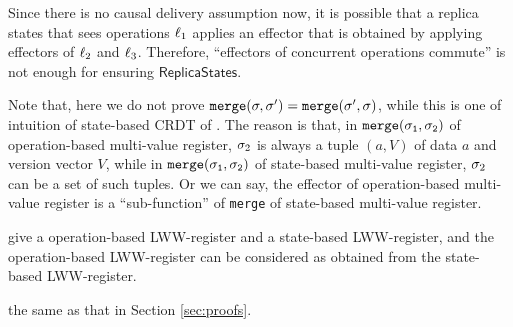 Since there is no causal delivery assumption now, it is possible that a replica states that sees operations $\alabel_1$ applies an effector that is obtained by applying effectors of $\alabel_2$ and $\alabel_3$. Therefore, ``effectors of concurrent operations commute'' is not enough for ensuring $\mathsf{ReplicaStates}$.


Note that, here we do not prove $\alabelshort[{\tt merge}]{\astate,\astate'} = \alabelshort[{\tt merge}]{\astate',\astate}$, while this is one of intuition of state-based CRDT of \cite{ShapiroPBZ11}. The reason is that, in $\alabelshort[{\tt merge}]{\astate_1,\astate_2}$ of operation-based multi-value register, $\astate_2$ is always a tuple $(a,V)$ of data $a$ and version vector $V$, while in $\alabelshort[{\tt merge}]{\astate_1,\astate_2}$ of state-based multi-value register, $\astate_2$ can be a set of such tuples. Or we can say, the effector of operation-based multi-value register is a ``sub-function'' of {\tt merge} of state-based multi-value register.





\cite{ShapiroPBZ11} give a operation-based LWW-register and a state-based LWW-register, and the operation-based LWW-register can be considered as obtained from the state-based LWW-register.

 the same as that in Section \ref{sec:proofs}.


